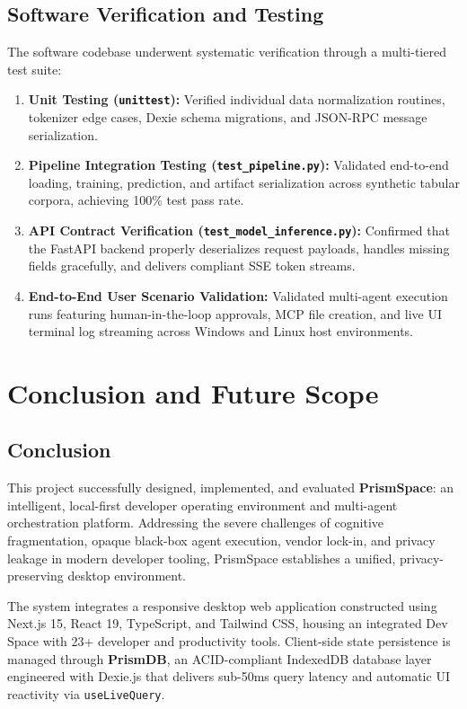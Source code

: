 \documentclass[12pt,a4paper]{report}
\begin{document}
\section{Software Verification and Testing}
The software codebase underwent systematic verification through a multi-tiered test suite:
\begin{enumerate}
    \item \textbf{Unit Testing (\texttt{unittest}):} Verified individual data normalization routines, tokenizer edge cases, Dexie schema migrations, and JSON-RPC message serialization.
    \item \textbf{Pipeline Integration Testing (\texttt{test\_pipeline.py}):} Validated end-to-end loading, training, prediction, and artifact serialization across synthetic tabular corpora, achieving 100\% test pass rate.
    \item \textbf{API Contract Verification (\texttt{test\_model\_inference.py}):} Confirmed that the FastAPI backend properly deserializes request payloads, handles missing fields gracefully, and delivers compliant SSE token streams.
    \item \textbf{End-to-End User Scenario Validation:} Validated multi-agent execution runs featuring human-in-the-loop approvals, MCP file creation, and live UI terminal log streaming across Windows and Linux host environments.
\end{enumerate}


\chapter{Conclusion and Future Scope}

\section{Conclusion}
This project successfully designed, implemented, and evaluated \textbf{PrismSpace}: an intelligent, local-first developer operating environment and multi-agent orchestration platform. Addressing the severe challenges of cognitive fragmentation, opaque black-box agent execution, vendor lock-in, and privacy leakage in modern developer tooling, PrismSpace establishes a unified, privacy-preserving desktop environment.

The system integrates a responsive desktop web application constructed using Next.js 15, React 19, TypeScript, and Tailwind CSS, housing an integrated Dev Space with 23+ developer and productivity tools. Client-side state persistence is managed through \textbf{PrismDB}, an ACID-compliant IndexedDB database layer engineered with Dexie.js that delivers sub-50ms query latency and automatic UI reactivity via \texttt{useLiveQuery}.
\end{document}
